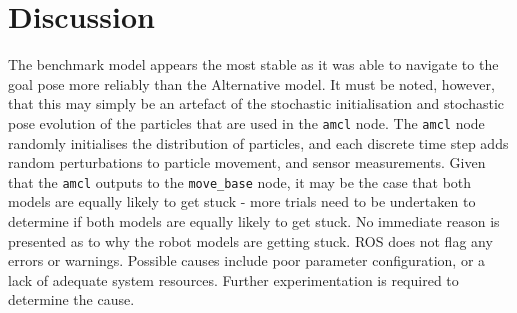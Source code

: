 \documentclass[a4paper]{article}
\begin{document}
\begin{minipage}{0.45\textwidth}
\centering
{}
\end{minipage}
\hspace{1cm}
\begin{minipage}{0.45\textwidth}
\centering
{}
\end{minipage}

\section{Discussion}
The benchmark model appears the most stable as it was able to navigate to the goal pose more reliably than the Alternative model. It must be noted, however, that this may simply be an artefact of the stochastic initialisation and stochastic pose evolution of the particles that are used in the \texttt{amcl} node. The \texttt{amcl} node randomly initialises the distribution of particles, and each discrete time step adds random perturbations to particle movement, and sensor measurements. Given that the \texttt{amcl} outputs to the \texttt{move\_base} node, it may be the case that both models are equally likely to get stuck - more trials need to be undertaken to determine if both models are equally likely to get stuck. No immediate reason is presented as to why the robot models are getting stuck. ROS does not flag any errors or warnings. Possible causes include poor parameter configuration, or a lack of adequate system resources. Further experimentation is required to determine the cause.\\
\end{document}
